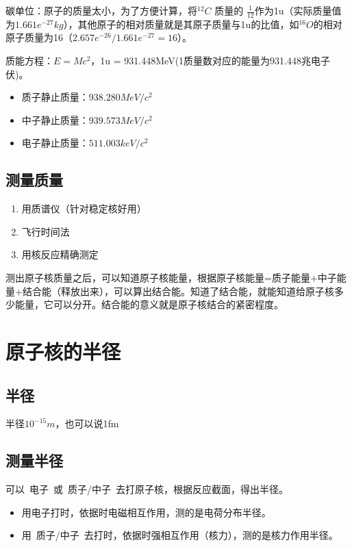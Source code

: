 碳单位：原子的质量太小，为了方便计算，将$^{12}C$ 质量的 $\frac{1}{12}$作为1u（实际质量值为$1.661e^{-27}kg$），其他原子的相对质量就是其原子质量与1u的比值，如$^{16}O$的相对原子质量为16（$2.657e^{-26}/1.661e^{-27}=16$）。
 
质能方程：$E = Mc^2$，1u = 931.448MeV(1质量数对应的能量为931.448兆电子伏)。

\begin{itemize}
    \item 质子静止质量：$938.280MeV/c^2$
    \item 中子静止质量：$939.573MeV/c^2$
    \item 电子静止质量：$511.003keV/c^2$
\end{itemize}

\subsection{测量质量}

\begin{enumerate}
    \item 用质谱仪（针对稳定核好用）
    \item 飞行时间法
    \item 用核反应精确测定
\end{enumerate}

\vspace{1.2em}

测出原子核质量之后，可以知道原子核能量，根据原子核能量=质子能量+中子能量+结合能（释放出来），可以算出结合能。知道了结合能，就能知道给原子核多少能量，它可以分开。结合能的意义就是原子核结合的紧密程度。

\section{原子核的半径}

\subsection{半径}

半径$10^{-15}m$，也可以说1fm

\subsection{测量半径}

可以~电子~或~质子/中子~去打原子核，根据反应截面，得出半径。

\begin{itemize}
    \item 用电子打时，依据时电磁相互作用，测的是电荷分布半径。
    \item 用~质子/中子~去打时，依据时强相互作用（核力），测的是核力作用半径。
\end{itemize}

